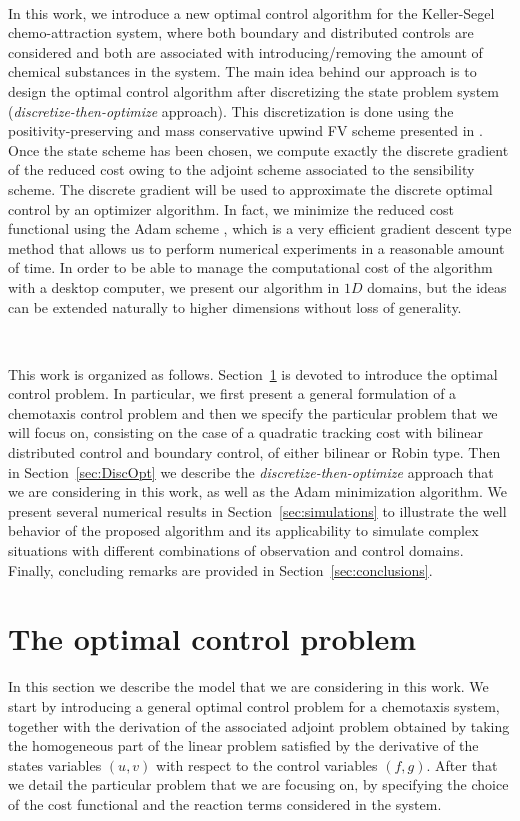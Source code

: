 \documentclass[11pt]{article}
\numberwithin{theorem}{section}
\begin{document}
\

In this work, we introduce a new optimal control algorithm for the Keller-Segel chemo-attraction system, where both boundary and distributed controls are considered and both are associated with introducing/removing the amount of chemical substances in the system. 
The main idea behind our approach is to design the optimal control algorithm after discretizing the state problem system (\textit{discretize-then-optimize} approach).  This discretization  is done using the positivity-preserving and mass conservative upwind FV scheme presented in \cite{Zhou-Saito}. 
Once the state scheme has been chosen, 
we compute exactly the discrete gradient of the reduced cost owing to  the  adjoint scheme associated to the sensibility  scheme. The discrete gradient will be used to approximate the discrete optimal control by an optimizer algorithm. In fact, we minimize the reduced cost functional using the Adam scheme \cite{KB15}, which is a very efficient gradient descent type method that allows us to perform numerical experiments in a reasonable amount of time. In order to be able to manage the computational cost of the algorithm with a desktop computer, we present our algorithm in $1D$ domains, but the ideas can be extended naturally to higher dimensions without loss of generality.

 



\

This work is organized as follows. Section~\ref{sec:model} is devoted to introduce the optimal control problem. In particular, we first present a general formulation of a chemotaxis  control problem and then we specify the particular problem that we will focus on, consisting on the case of a quadratic tracking cost with bilinear distributed control and boundary control, of either bilinear or Robin type.
Then in Section~\ref{sec:DiscOpt} we describe the \textit{discretize-then-optimize} approach that we are considering in this work, as well as the Adam minimization algorithm.
We present several numerical results in Section~\ref{sec:simulations} to illustrate the well behavior of the proposed algorithm and its applicability to simulate complex situations with different combinations of observation and control domains.
Finally, concluding remarks are provided in Section~\ref{sec:conclusions}.


\section{The optimal control problem}\label{sec:model}
In this section we describe the model that we are considering in this work. We start by introducing a general optimal control problem for a chemotaxis system, together with the derivation of the associated adjoint problem obtained by taking the homogeneous part of the linear problem satisfied by the derivative of the states variables $(u,v)$ with respect to the control variables $(f,g)$. After that we detail the particular problem that we are focusing on, by specifying the choice of the cost functional and the reaction terms considered in the system.
\end{document}
